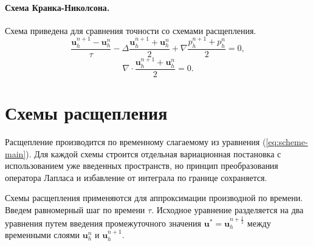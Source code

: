 \documentclass[12pt]{article}
\begin{document}
\paragraph{Схема Кранка-Николсона.} Схема приведена для сравнения точности со схемами расщепления.
$$
\frac{{\bm u}_h^{n+1}-{\bm u}_h^n}{\tau} - \Delta \frac{{\bm u}_h^{n+1}+{\bm u}_h^n}{2}+\nabla \frac{p_h^{n+1}+p_h^n}{2}=0,
$$
$$
\nabla \cdot \frac{{\bm u}_h^{n+1}+{\bm u}_h^{n}}{2}=0.
$$

\section{Схемы расщепления}
Расщепление производится по временному слагаемому из уравнения (\ref{eq:scheme-main}). Для каждой схемы строится отдельная вариационная постановка с использованием уже введенных пространств, но принцип преобразования оператора Лапласа и избавление от интеграла по границе сохраняется.

Схемы расщепления применяются для аппроксимации производной по времени. Введем равномерный шаг по времени $\tau$. Исходное уравнение разделяется на два уравнения путем введения промежуточного значения ${\bm u}^*={\bm u}_h^{n+\frac{1}{2}}$ между временными слоями ${\bm u}_h^n$ и ${\bm u}_h^{n+1}$.
\end{document}
